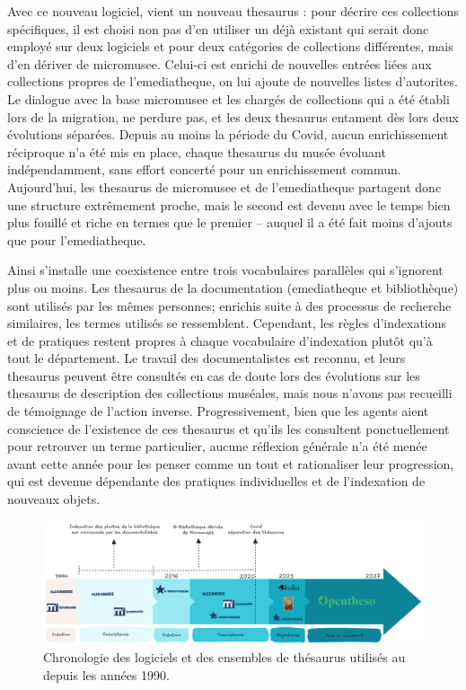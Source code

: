 Avec ce nouveau logiciel, vient un nouveau \gls{thesaurus} : pour décrire ces collections spécifiques, il est choisi non pas d'en utiliser un déjà existant qui serait donc employé sur deux logiciels et pour deux catégories de collections différentes, mais d'en dériver de \gls{micromusee}. Celui-ci est enrichi de nouvelles entrées liées aux collections propres de l'\gls{emediatheque}, on lui ajoute de nouvelles listes d'\glspl{autorite}. Le dialogue avec la base \gls{micromusee} et les chargés de collections qui a été établi lors de la migration, ne perdure pas, et les deux \gls{thesaurus} entament dès lors deux évolutions séparées. Depuis au moins la période du Covid, aucun enrichissement réciproque n'a été mis en place, chaque \gls{thesaurus} du musée évoluant indépendamment, sans effort concerté pour un enrichissement commun. Aujourd'hui, les \gls{thesaurus} de \gls{micromusee} et de l'\gls{emediatheque} partagent donc une structure extrêmement proche, mais le second est devenu avec le temps bien plus fouillé et riche en termes que le premier -- auquel il a été fait moins d'ajouts que pour l'\gls{emediatheque}.

Ainsi s'installe une coexistence entre trois vocabulaires parallèles qui s'ignorent plus ou moins. Les \gls{thesaurus} de la documentation (\gls{emediatheque} et bibliothèque) sont utilisés par les mêmes personnes; enrichis suite à des processus de recherche similaires, les termes utilisés se ressemblent. Cependant, les règles d'indexations et de pratiques restent propres à chaque vocabulaire d'indexation plutôt qu'à tout le département. Le travail des documentalistes est reconnu, et leurs \gls{thesaurus} peuvent être consultés en cas de doute lors des évolutions sur les \gls{thesaurus} de description des collections muséales, mais nous n'avons pas recueilli de témoignage de l'action inverse. Progressivement, bien que les agents aient conscience de l'existence de ces \gls{thesaurus} et qu'ils les consultent ponctuellement pour retrouver un terme particulier, aucune réflexion générale n'a été menée avant cette année pour les penser comme un tout et rationaliser leur progression, qui est devenue dépendante des pratiques individuelles et de l'indexation de nouveaux objets.

\begin{figure}
	\centering
	\includegraphics[width=0.9\linewidth]{img/FRISE_Thesaurus}
	\caption{Chronologie des logiciels et des ensembles de thésaurus utilisés au \mae depuis les années 1990.}
	\label{frise:thesaurus}
\end{figure}


